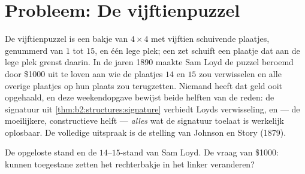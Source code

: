 \section{Probleem: De vijftienpuzzel}

De vijftienpuzzel is een bakje van $4 \times 4$ met vijftien
schuivende plaatjes, genummerd van $1$ tot $15$, en één lege plek;
een zet schuift een plaatje dat aan de lege plek grenst daarin. In
de jaren 1890 maakte Sam Loyd de puzzel beroemd door \$1000 uit te
loven aan wie de plaatjes $14$ en $15$ zou verwisselen en alle
overige plaatjes op hun plaats zou terugzetten. Niemand heeft dat
geld ooit opgehaald, en deze weekendopgave bewijst beide helften
van de reden: de signatuur uit
\cref{thm:b2:structures:signature} verbiedt Loyds verwisseling,
en --- de moeilijkere, constructieve helft --- \emph{alles} wat de
signatuur toelaat is werkelijk oplosbaar. De volledige uitspraak
is de stelling van Johnson en Story (1879).

\begin{omfigure}
\qquad
{}

{\small De opgeloste stand en de $14$--$15$-stand van Sam Loyd. De
vraag van \$1000: kunnen toegestane zetten het rechterbakje in het
linker veranderen?}
\end{omfigure}

